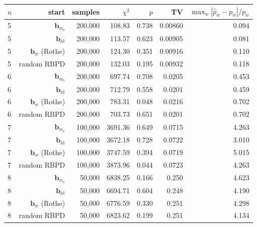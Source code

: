 \begin{tabular}{lrrrrrr}
\hline
$n$ & start & samples & $\chi^2$ & $p$ & TV & $\max_w |\hat{p}_w - p_w|/p_w$ \\
\hline
5 & $\mathbf{b}_{w_0}$    & 200{,}000 & 108.83  & 0.738 & 0.00860 & 0.094 \\
5 & $\mathbf{b}_{\mathrm{id}}$ & 200{,}000 & 113.57  & 0.623 & 0.00905 & 0.081 \\
5 & $\mathbf{b}_w$ (Rothe) & 200{,}000 & 124.30  & 0.351 & 0.00916 & 0.110 \\
5 & random RBPD             & 200{,}000 & 132.03  & 0.195 & 0.00932 & 0.118 \\
\hline
6 & $\mathbf{b}_{w_0}$    & 200{,}000 & 697.74  & 0.708 & 0.0205 & 0.453 \\
6 & $\mathbf{b}_{\mathrm{id}}$ & 200{,}000 & 712.79  & 0.558 & 0.0201 & 0.459 \\
6 & $\mathbf{b}_w$ (Rothe) & 200{,}000 & 783.31  & 0.048 & 0.0216 & 0.702 \\
6 & random RBPD             & 200{,}000 & 703.73  & 0.651 & 0.0201 & 0.702 \\
\hline
7 & $\mathbf{b}_{w_0}$    & 100{,}000 & 3691.36 & 0.649 & 0.0715 & 4.263 \\
7 & $\mathbf{b}_{\mathrm{id}}$ & 100{,}000 & 3672.18 & 0.728 & 0.0722 & 3.010 \\
7 & $\mathbf{b}_w$ (Rothe) & 100{,}000 & 3747.59 & 0.394 & 0.0719 & 5.015 \\
7 & random RBPD             & 100{,}000 & 3873.96 & 0.044 & 0.0723 & 4.263 \\
\hline
8 & $\mathbf{b}_{w_0}$    & 50{,}000 & 6838.25 & 0.166 & 0.250 & 4.623 \\
8 & $\mathbf{b}_{\mathrm{id}}$ & 50{,}000 & 6694.71 & 0.604 & 0.248 & 4.190 \\
8 & $\mathbf{b}_w$ (Rothe) & 50{,}000 & 6776.59 & 0.330 & 0.251 & 4.298 \\
8 & random RBPD             & 50{,}000 & 6823.62 & 0.199 & 0.251 & 4.134 \\
\hline
\end{tabular}
